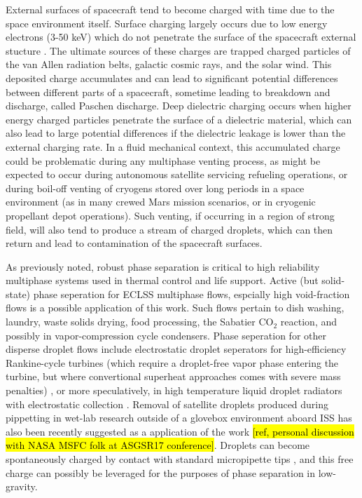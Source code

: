\documentclass[12pt,a4paper,oneside]{book}
\begin{document}
External surfaces of spacecraft tend to become charged with time due to the space environment itself. Surface charging largely occurs due to low energy electrons (3-50 keV) which do not penetrate the surface of the spacecraft external stucture \cite{czepiela_charging_1997}. The ultimate sources of these charges are trapped charged particles of the van Allen radiation belts, galactic cosmic rays, and the solar wind. This deposited charge accumulates and can lead to significant potential differences between different parts of a spacecraft, sometime leading to breakdown and discharge, called Paschen discharge. Deep dielectric charging occurs when higher energy charged particles penetrate the surface of a dielectric material, which can also lead to large potential differences if the dielectric leakage is lower than the external charging rate. In a fluid mechanical context, this accumulated charge could be problematic during any multiphase venting process, as might be expected to occur during autonomous satellite servicing refueling operations, or during boil-off venting of cryogens stored over long periods in a space environment (as in many crewed Mars mission scenarios, or in cryogenic propellant depot operations). Such venting, if occurring in a region of strong field, will also tend to produce a stream of charged droplets, which can then return and lead to contamination of the spacecraft surfaces.

As previously noted, robust phase separation is critical to high reliability multiphase systems used in thermal control and life support. Active (but solid-state) phase seperation for ECLSS multiphase flows, espcially high void-fraction flows is a possible application of this work. Such flows pertain to dish washing, laundry, waste solids drying, food processing, the Sabatier CO$_2$ reaction, and possibly in vapor-compression cycle condensers. Phase seperation for other disperse droplet flows include electrostatic droplet seperators for high-efficiency Rankine-cycle turbines (which require a droplet-free vapor phase entering the turbine, but where convertional superheat approaches comes with severe mass penalties) \cite{unterberg_zero_1962}, or more speculatively, in high temperature liquid droplet radiators with electrostatic collection \cite{white_liquid_1987}. Removal of satellite droplets produced during pippetting in wet-lab research outside of a glovebox environment aboard ISS has also been recently suggested as a application of the work \hl{[ref, personal discussion with NASA MSFC folk at ASGSR17 conference]}. Droplets can become spontaneously charged by contact with standard micropipette tips \cite{choi_spontaneous_2013}, and this free charge can possibly be leveraged for the purposes of phase separation in low-gravity. 
\end{document}

